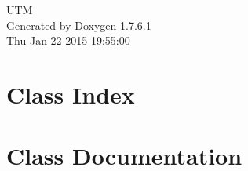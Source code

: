 \documentclass[a4paper]{book}
\begin{document}
\hypersetup{pageanchor=false,citecolor=blue}
\begin{titlepage}
\vspace*{7cm}
\begin{center}
{\Large \-U\-T\-M }\\
\vspace*{1cm}
{\large \-Generated by Doxygen 1.7.6.1}\\
\vspace*{0.5cm}
{\small Thu Jan 22 2015 19:55:00}\\
\end{center}
\end{titlepage}
\clearemptydoublepage
{}
\tableofcontents
\clearemptydoublepage
{}
\hypersetup{pageanchor=true,citecolor=blue}
\chapter{\-Class \-Index}

\chapter{\-Class \-Documentation}
















\printindex
\end{document}
